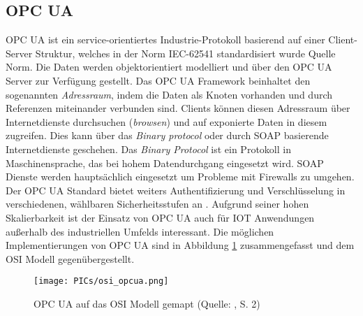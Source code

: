 \documentclass[BMR,Bachelor,ngerman]{twbook}%
\begin{document}
\subsection{\acf{OPC UA}}
\ac{OPC UA} \cite{opcua} ist ein service-orientiertes Industrie-Protokoll basierend auf einer Client-Server Struktur, welches in der Norm IEC-62541 standardisiert wurde {\color{red}Quelle Norm}. Die Daten werden objektorientiert modelliert und über den \ac{OPC UA} Server zur Verfügung gestellt. Das \ac{OPC UA} Framework beinhaltet den sogenannten \emph{Adressraum}, indem die Daten als Knoten vorhanden und durch Referenzen miteinander verbunden sind. Clients können diesen Adressraum über Internetdienste durchsuchen (\emph{browsen}) und auf exponierte Daten in diesem zugreifen. Dies kann über das \emph{Binary protocol} oder durch \ac{SOAP} basierende Internetdienste geschehen. Das \emph{Binary Protocol} ist ein Protokoll in Maschinensprache, das bei hohem Datendurchgang eingesetzt wird. \ac{SOAP} Dienste werden hauptsächlich eingesetzt um Probleme mit Firewalls zu umgehen. Der \ac{OPC UA} Standard bietet weiters Authentifizierung und Verschlüsselung in verschiedenen, wählbaren Sicherheitsstufen an \cite{palm2015open}. Aufgrund seiner hohen Skalierbarkeit ist der Einsatz von \ac{OPC UA} auch für \ac{IOT} Anwendungen außerhalb des industriellen Umfelds interessant. Die möglichen Implementierungen von \ac{OPC UA} sind in Abbildung \ref{fig:opcua} zusammengefasst und dem \ac{OSI} Modell gegenübergestellt.
\clearpage
\begin{figure}[!h]
\centering
\texttt{[image: PICs/osi\_opcua.png]}
\caption{\ac{OPC UA} auf das \ac{OSI} Modell gemapt (Quelle: \protect\cite{neumann2015opcua}, S. 2)}\label{fig:opcua}
\end{figure}
\end{document}
